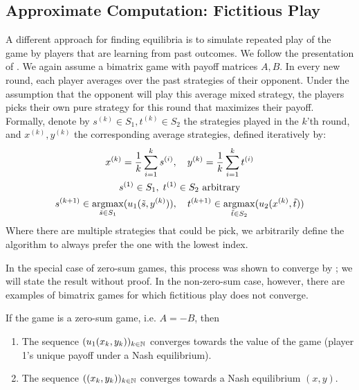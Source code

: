 \documentclass[a4paper]{scrreprt}
\begin{document}
    \subsection{Approximate Computation: Fictitious Play}
    A different approach for finding equilibria is to simulate repeated play of the game by players that are learning from past outcomes.
    We follow the presentation of \cite{bib:daskalakisFictitiousPlayLectureNotes}.
    We again assume a bimatrix game with payoff matrices $A, B$.
    In every new round, each player averages over the past strategies of their opponent. Under the assumption that the opponent will play this average mixed strategy, the players picks their own pure strategy for this round that maximizes their payoff. Formally, denote by $s^{(k)} \in S_1, t^{(k)} \in S_2$ the strategies played in the $k$'th round, and $x^{(k)}, y^{(k)}$ the corresponding average strategies, defined iteratively by:
    \begin{gather*}
        x^{(k)} = \frac{1}{k} \sum_{i=1}^{k} s^{(i)}, \quad y^{(k)} = \frac{1}{k} \sum_{i=1}^{k} t^{(i)} \\
        s^{(1)} \in S_1,\; t^{(1)} \in S_2 \text{ arbitrary} \\
        s^{(k+1)} \in \mathop{\operatorname{argmax}}\limits_{\tilde{s} \in S_1} (u_1(\tilde{s}, y^{(k)})), \quad
        t^{(k+1)} \in \mathop{\operatorname{argmax}}\limits_{\tilde{t} \in S_2} (u_2(x^{(k)}, \tilde{t}))
    \end{gather*}
    Where there are multiple strategies that could be pick, we arbitrarily define the algorithm to always prefer the one with the lowest index.
    
    In the special case of zero-sum games, this process was shown to converge by \cite{bib:robinsonFictitiousPlay}; we will state the result without proof.
    In the non-zero-sum case, however, there are examples of bimatrix games for which fictitious play does not converge.
    
    \begin{thm}
        \label{thm:fictitiousPlayConverges}
        If the game is a zero-sum game, i.e. $A=-B$, then 
        \begin{enumerate}
            \item The sequence $(u_1(x_k, y_k))_{k \in \mathbb{N}}$ converges towards the value of the game (player 1's unique payoff under a Nash equilibrium).
            \item The sequence $((x_k, y_k))_{k \in \mathbb{N}}$ converges towards a Nash equilibrium $(x, y)$.
        \end{enumerate}
    \end{thm}
\end{document}
